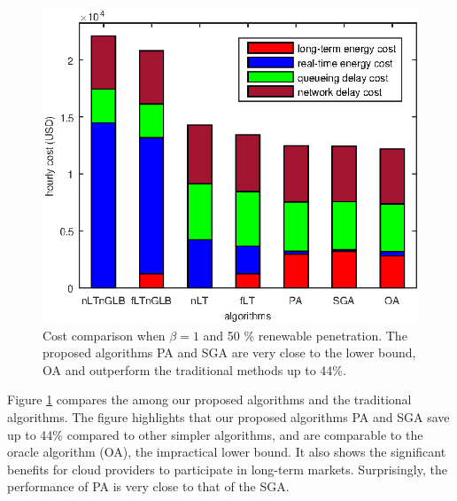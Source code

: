 \begin{figure}[!ht]    
	\centering
	\includegraphics[width=.95\linewidth]{figs/cost_comparison}
	\vspace{-0.3cm}
	\caption{Cost comparison when $\beta=1$ and 50 \% renewable penetration. The proposed algorithms PA and SGA  are very close to the lower bound, OA and outperform the traditional methods up to 44\%.}
	\label{fig:cost_comparison}
\end{figure}

Figure \ref{fig:cost_comparison} compares the   among our proposed algorithms and the traditional algorithms. The figure highlights that our proposed algorithms PA and SGA save up to 44\% compared to other simpler algorithms, and are comparable to the oracle algorithm (OA), the impractical lower bound. It also shows the significant benefits for cloud providers to participate in long-term markets. Surprisingly, the performance of PA is very close to that of the SGA.



